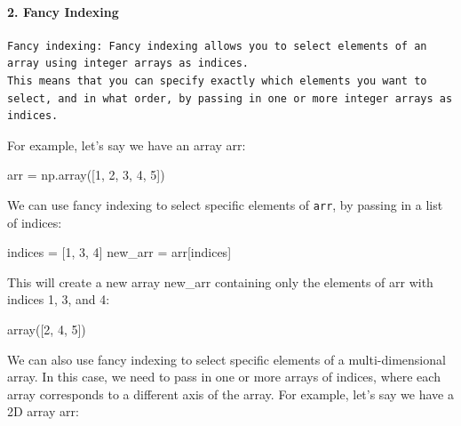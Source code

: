\documentclass[11pt]{article}
\newenvironment{Shaded}{}{}
\newcommand{\DecValTok}[1]{\textcolor[rgb]{0.25,0.63,0.44}{{#1}}}
\newcommand{\NormalTok}[1]{{#1}}
\newcommand{\OperatorTok}[1]{\textcolor[rgb]{0.40,0.40,0.40}{{#1}}}
\begin{document}
\hypertarget{fancy-indexing}{%
\paragraph{2. Fancy Indexing}\label{fancy-indexing}}

\begin{verbatim}
Fancy indexing: Fancy indexing allows you to select elements of an array using integer arrays as indices.
This means that you can specify exactly which elements you want to select, and in what order, by passing in one or more integer arrays as indices.
\end{verbatim}

For example, let's say we have an array arr:

\begin{Shaded}
\begin{Highlighting}[]
\NormalTok{arr }\OperatorTok{=}\NormalTok{ np.array([}\DecValTok{1}\NormalTok{, }\DecValTok{2}\NormalTok{, }\DecValTok{3}\NormalTok{, }\DecValTok{4}\NormalTok{, }\DecValTok{5}\NormalTok{])}
\end{Highlighting}
\end{Shaded}

We can use fancy indexing to select specific elements of \texttt{arr},
by passing in a list of indices:

\begin{Shaded}
\begin{Highlighting}[]
\NormalTok{indices }\OperatorTok{=}\NormalTok{ [}\DecValTok{1}\NormalTok{, }\DecValTok{3}\NormalTok{, }\DecValTok{4}\NormalTok{]}
\NormalTok{new\_arr }\OperatorTok{=}\NormalTok{ arr[indices]}
\end{Highlighting}
\end{Shaded}

This will create a new array new\_arr containing only the elements of
arr with indices 1, 3, and 4:

\begin{Shaded}
\begin{Highlighting}[]
\NormalTok{array([}\DecValTok{2}\NormalTok{, }\DecValTok{4}\NormalTok{, }\DecValTok{5}\NormalTok{])}
\end{Highlighting}
\end{Shaded}

We can also use fancy indexing to select specific elements of a
multi-dimensional array. In this case, we need to pass in one or more
arrays of indices, where each array corresponds to a different axis of
the array. For example, let's say we have a 2D array arr:
\end{document}
